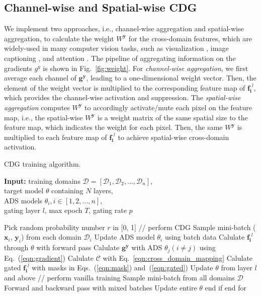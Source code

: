 \subsection{Channel-wise and Spatial-wise CDG}
\label{sec:weights}
We implement two approaches, i.e., channel-wise aggregation and spatial-wise aggregation, to calculate the weight $W^\mathbf{y}$ for the cross-domain features, which are widely-used in many computer vision tasks, such as visualization \citep{selvaraju2017grad,chattopadhay2018grad,omeiza2019smooth,wang2020score}, image captioning \citep{you2016image}, and attention \citep{chen2017sca}. The pipeline of aggregating information on the gradients $g^y$ is shown in Fig.~\ref{fig:weight}. For {\itshape channel-wise aggregation}, we first average each channel of $\mathbf{g^y}$, leading to a one-dimensional weight vector. Then, the element of the weight vector is multiplied to the corresponding feature map of $\mathbf{f_{i}}^l$, which provides the channel-wise activation and suppression. The {\itshape spatial-wise aggregation} computes $W^\mathbf{y}$ to accordingly activate/mute each pixel on the feature map, i.e., the spatial-wise $W^\mathbf{y}$ is a weight matrix of the same spatial size to the feature map, which indicates the weight for each pixel. Then, the same $W^\mathbf{y}$ is multiplied to each feature map of $\mathbf{f_{i}}^l$ to achieve spatial-wise cross-domain activation.

\begin{algorithm}[tb]
  \caption{CDG training algorithm.}
  \label{alg:strategy}
  {\bf Input:}
  training domains $\mathcal{D}=[\mathcal{D}_1, \mathcal{D}_2, ..., \mathcal{D}_n]$, \\
  target model $\theta$ containing $N$ layers, \\
  ADS models $\theta_i, i\in [1,2, ..., n]$, \\
  gating layer $l$, max epoch $T$, gating rate $p$
  \begin{algorithmic}[1]
    \State Pick random probability number $r$ in [0, 1]
    \State // perform CDG
    \State Sample mini-batch ($\mathbf{x}_i$, $\mathbf{y}_i$) from each domain $\mathcal{D}_i$
    \State Update ADS model $\theta_i$ using batch data
    \State Calulate $\mathbf{f_{i}}^l$ through $\theta$ with forward pass
    \State Calulate $\mathbf{g^y}$ with ADS $\theta_j(i\neq j)$ using Eq.~(\ref{eqn:gradient})
    \State Calulate $\mathcal{C}$ with Eq.~\ref{eqn:cross_domain_mapping}
    \State Calulate gated $\mathbf{f_{i}}^l$ with masks in Eqs.~(\ref{eqn:mask}) and~(\ref{eqn:gated})
    \State Update $\theta$ from layer $l$ and above
    \Else
    \State // perform vanilla training
    \State Sample mini-batch from all domains $\mathcal{D}$
    \State Forward and backward pass with mixed batches
    \State Update entire $\theta$
    \EndIf
    \State end if
    \EndFor
    \State end for
  \end{algorithmic}
\end{algorithm}


